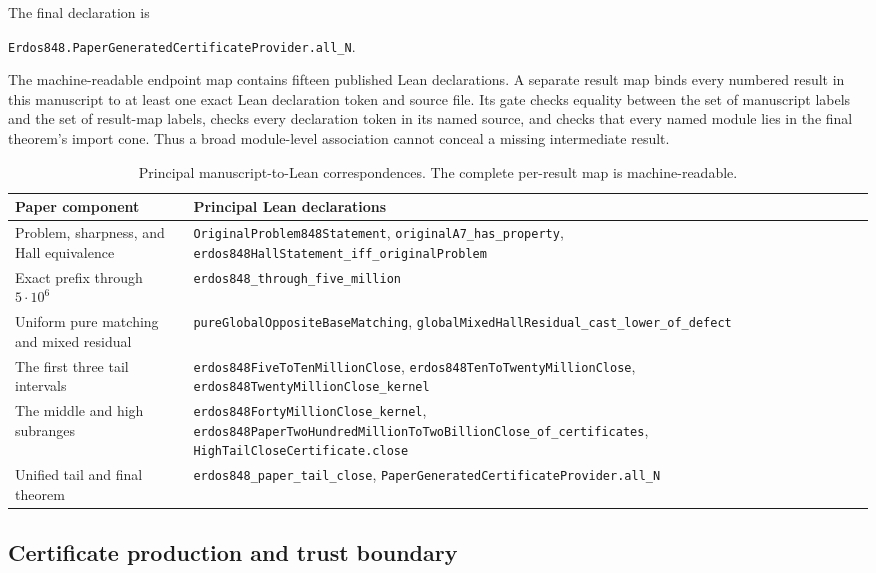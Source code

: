 \documentclass[11pt]{article}
\theoremstyle{definition}
\newcommand{\FiveMillion}{5\cdot10^6}
\begin{document}
The final declaration is
\begin{center}\small
\texttt{Erdos848.PaperGeneratedCertificateProvider.all\_N}.
\end{center}
The machine-readable endpoint map contains fifteen published Lean
declarations.  A separate result map binds every numbered result in this
manuscript to at least one exact Lean declaration token and source file.  Its
gate checks equality between the set of manuscript labels and the set of
result-map labels, checks every declaration token in its named source, and
checks that every named module lies in the final theorem's import cone.
Thus a broad module-level association cannot conceal a missing intermediate
result.

\begin{table}[ht]
\centering
\footnotesize
\renewcommand{\arraystretch}{1.14}
\begin{tabularx}{\textwidth}{@{}>{\raggedright\arraybackslash}p{}Y@{}}
\toprule
Paper component & Principal Lean declarations\\
\midrule
Problem, sharpness, and Hall equivalence &
\texttt{OriginalProblem848Statement},
\texttt{originalA7\_has\_property},
\texttt{erdos848HallStatement\_iff\_originalProblem}\\
\addlinespace
Exact prefix through $\FiveMillion$ &
\texttt{erdos848\_through\_five\_million}\\
\addlinespace
Uniform pure matching and mixed residual &
\texttt{pureGlobalOppositeBaseMatching},
\texttt{globalMixedHallResidual\_cast\_lower\_of\_defect}\\
\addlinespace
The first three tail intervals &
\texttt{erdos848FiveToTenMillionClose},
\texttt{erdos848TenToTwentyMillionClose},
\texttt{erdos848TwentyMillionClose\_kernel}\\
\addlinespace
The middle and high subranges &
\texttt{erdos848FortyMillionClose\_kernel},
\texttt{erdos848PaperTwoHundredMillionToTwoBillionClose\_of\_certificates},
\texttt{HighTailCloseCertificate.close}\\
\addlinespace
Unified tail and final theorem &
\texttt{erdos848\_paper\_tail\_close},
\texttt{PaperGeneratedCertificateProvider.all\_N}\\
\bottomrule
\end{tabularx}
\caption{Principal manuscript-to-Lean correspondences.  The complete
per-result map is machine-readable.}
\label{tab:lean-correspondence}
\end{table}

\subsection*{Certificate production and trust boundary}
\end{document}
